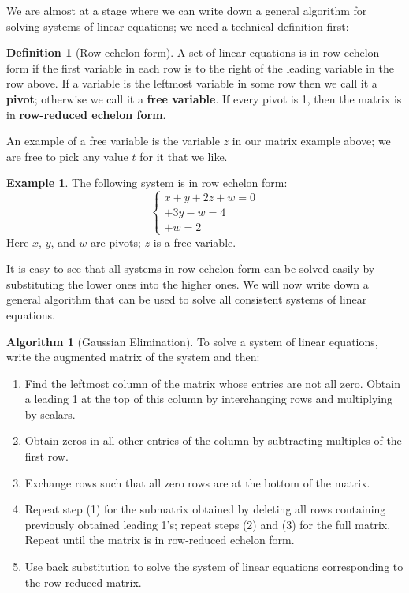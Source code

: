 \documentclass[a4paper,leqno]{article}
\numberwithin{equation}{section}
\theoremstyle{definition}
\newtheorem{defn}[equation]{Definition}
\newtheorem{ex}[equation]{Example}
\newtheorem{alg}[equation]{Algorithm}
\theoremstyle{remark}
\newcommand{\df}[1]{\textbf{#1}}
\begin{document}
We are almost at a stage where we can write down a general algorithm for solving systems of linear equations; we need
a technical definition first:

\begin{defn}[Row echelon form]
  A set of linear equations is in row echelon form if the first variable in each row is to the right of the leading
  variable in the row above. If a variable is the leftmost variable in some row then we call it a \df{pivot}; otherwise
  we call it a \df{free variable}. If every pivot is 1, then the matrix is in \df{row-reduced echelon form}.
\end{defn}

An example of a free variable is the variable $ z $ in our matrix example above; we are free to pick any value $ t $ for it
that we like.

\begin{ex}
  The following system is in row echelon form:
  \begin{equation*}
    \begin{cases}
      x +  y + 2z + w = 0\\
        + 3y      - w = 4\\
                  + w = 2
    \end{cases}
  \end{equation*}
  Here $ x $, $ y $, and $ w $ are pivots; $ z $ is a free variable.
\end{ex}

It is easy to see that all systems in row echelon form can be solved easily by substituting the lower ones
into the higher ones. We will now write down a general algorithm that can be used to solve all consistent
systems of linear equations.
\begin{alg}[Gaussian Elimination]
  To solve a system of linear equations, write the augmented matrix of the system and then:
  \begin{enumerate}
    \item Find the leftmost column of the matrix whose entries are not all zero. Obtain a leading 1 at the top of this
          column by interchanging rows and multiplying by scalars.
    \item Obtain zeros in all other entries of the column by subtracting multiples of the first row.
    \item Exchange rows such that all zero rows are at the bottom of the matrix.
    \item Repeat step (1) for the submatrix obtained by deleting all rows containing previously obtained leading 1's; repeat
          steps (2) and (3) for the full matrix. Repeat until the matrix is in row-reduced echelon form.
    \item Use back substitution to solve the system of linear equations corresponding to the row-reduced matrix.
  \end{enumerate}
\end{alg}
\end{document}
